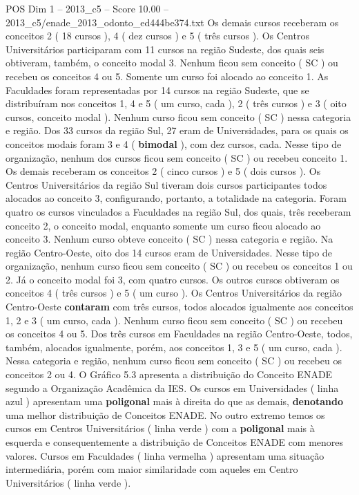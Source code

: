 \begin{textsample}{POS Dim 1 – 2013\_c5 – Score 10.00 – 2013\_c5/enade\_2013\_odonto\_ed444be374.txt}
Os demais cursos receberam os conceitos 2 ( 18 cursos ), 4 ( dez cursos ) e 5 ( três cursos ).
Os Centros Universitários participaram com 11 cursos na região Sudeste, dos quais seis obtiveram, também, o conceito modal 3.
Nenhum ficou sem conceito ( SC ) ou recebeu os conceitos 4 ou 5.
Somente um curso foi alocado ao conceito 1.
As Faculdades foram representadas por 14 cursos na região Sudeste, que se distribuíram nos conceitos 1, 4 e 5 ( um curso, cada ), 2 ( três cursos ) e 3 ( oito cursos, conceito modal ).
Nenhum curso ficou sem conceito ( SC ) nessa categoria e região.
Dos 33 cursos da região Sul, 27 eram de Universidades, para os quais os conceitos modais foram 3 e 4 ( \textbf{bimodal} ), com dez cursos, cada.
Nesse tipo de organização, nenhum dos cursos ficou sem conceito ( SC ) ou recebeu conceito 1.
Os demais receberam os conceitos 2 ( cinco cursos ) e 5 ( dois cursos ).
Os Centros Universitários da região Sul tiveram dois cursos participantes todos alocados ao conceito 3, configurando, portanto, a totalidade na categoria.
Foram quatro os cursos vinculados a Faculdades na região Sul, dos quais, três receberam conceito 2, o conceito modal, enquanto somente um curso ficou alocado ao conceito 3.
Nenhum curso obteve conceito ( SC ) nessa categoria e região.
Na região Centro-Oeste, oito dos 14 cursos eram de Universidades.
Nesse tipo de organização, nenhum curso ficou sem conceito ( SC ) ou recebeu os conceitos 1 ou 2.
Já o conceito modal foi 3, com quatro cursos.
Os outros cursos obtiveram os conceitos 4 ( três cursos ) e 5 ( um curso ).
Os Centros Universitários da região Centro-Oeste \textbf{contaram} com três cursos, todos alocados igualmente aos conceitos 1, 2 e 3 ( um curso, cada ).
Nenhum curso ficou sem conceito ( SC ) ou recebeu os conceitos 4 ou 5.
Dos três cursos em Faculdades na região Centro-Oeste, todos, também, alocados igualmente, porém, aos conceitos 1, 3 e 5 ( um curso, cada ).
Nessa categoria e região, nenhum curso ficou sem conceito ( SC ) ou recebeu os conceitos 2 ou 4.
O Gráfico 5.3 apresenta a distribuição do Conceito ENADE segundo a Organização Acadêmica da IES.
Os cursos em Universidades ( linha azul ) apresentam uma \textbf{poligonal} mais à direita do que as demais, \textbf{denotando} uma melhor distribuição de Conceitos ENADE.
No outro extremo temos os cursos em Centros Universitários ( linha verde ) com a \textbf{poligonal} mais à esquerda e consequentemente a distribuição de Conceitos ENADE com menores valores.
Cursos em Faculdades ( linha vermelha ) apresentam uma situação intermediária, porém com maior similaridade com aqueles em Centro Universitários ( linha verde ).

\end{textsample}
